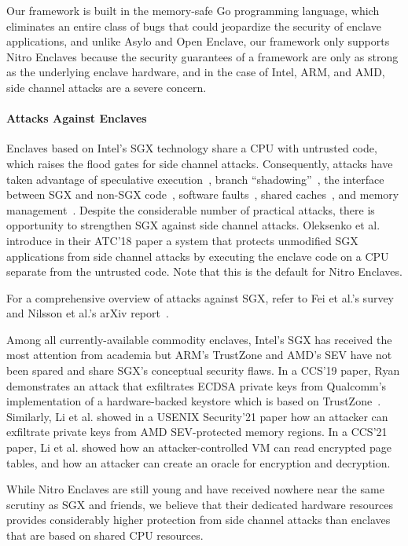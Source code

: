 Our framework is built in the memory-safe Go programming language, which
eliminates an entire class of bugs that could jeopardize the security of
enclave applications, and unlike Asylo and Open Enclave, our framework only
supports Nitro Enclaves because the security guarantees of a framework are only
as strong as the underlying enclave hardware, and in the case of Intel, ARM,
and AMD, side channel attacks are a severe concern.

\paragraph{Attacks Against Enclaves}

Enclaves based on Intel's SGX technology share a CPU with untrusted code, which
raises the flood gates for side channel attacks.  Consequently, attacks have
taken advantage of
speculative execution~\cite{VanBulck2018a,VanSchaik2021a},
branch ``shadowing''~\cite{Lee2017b},
the interface between SGX and non-SGX code~\cite{Bulck19a},
software faults~\cite{Murdock2020a},
shared caches~\cite{Brasser2017a},
and memory management~\cite{Wang2017a}.
Despite the considerable number of practical attacks, there is opportunity to
strengthen SGX against side channel attacks.  Oleksenko et al. introduce in
their ATC'18 paper a system that protects unmodified SGX applications from side
channel attacks by executing the enclave code on a CPU separate from the
untrusted code.  Note that this is the default for Nitro Enclaves.

For a comprehensive overview of attacks against SGX, refer to Fei et al.'s
survey~\cite{Fei2021a} and Nilsson et al.'s arXiv report~\cite{Nilsson20a}.

Among all currently-available commodity enclaves, Intel's SGX has received the
most attention from academia but ARM's TrustZone and AMD's SEV have not been
spared and share SGX's conceptual security flaws.  In a CCS'19 paper, Ryan
demonstrates an attack that exfiltrates ECDSA private keys from Qualcomm's
implementation of a hardware-backed keystore which is based on
TrustZone~\cite{Ryan2019a}.  Similarly, Li et al. showed in a USENIX
Security'21 paper how an attacker can exfiltrate private keys from AMD
SEV-protected memory regions.  In a CCS'21 paper, Li et al. showed how an
attacker-controlled VM can read encrypted page tables, and how an attacker can
create an oracle for encryption and decryption.

While Nitro Enclaves are still young and have received nowhere near the same
scrutiny as SGX and friends, we believe that their dedicated hardware resources
provides considerably higher protection from side channel attacks than enclaves
that are based on shared CPU resources.

